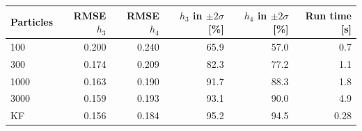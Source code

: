 \begin{tabular}{lrrrrr}
\toprule
Particles & RMSE $h_3$ & RMSE $h_4$ & $h_3$ in $\pm2\sigma$ [\%] & $h_4$ in $\pm2\sigma$ [\%] & Run time [s] \\
\midrule
100 & 0.200 & 0.240 & 65.9 & 57.0 & 0.7 \\
300 & 0.174 & 0.209 & 82.3 & 77.2 & 1.1 \\
1000 & 0.163 & 0.190 & 91.7 & 88.3 & 1.8 \\
3000 & 0.159 & 0.193 & 93.1 & 90.0 & 4.9 \\
KF & 0.156 & 0.184 & 95.2 & 94.5 & 0.28 \\
\bottomrule
\end{tabular}
